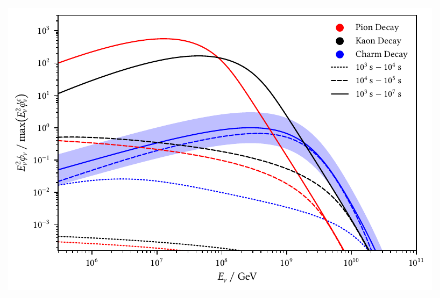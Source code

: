 \begin{figure}[H]
	\centering
	\includegraphics{../plots/build/magnetar_integrated_neutrino_spectrum_without.pdf}
	\caption[]{}
	\label{fig:magnetar-fluence-without}
\end{figure}
